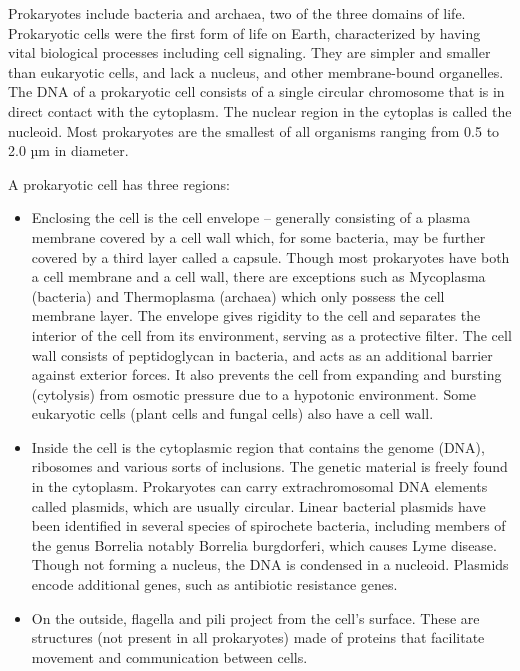Prokaryotes include bacteria and archaea, two of the three domains of life. Prokaryotic cells were the first form of life on Earth, characterized by having vital biological processes including cell signaling. They are simpler and smaller than eukaryotic cells, and lack a nucleus, and other membrane-bound organelles. The DNA of a prokaryotic cell consists of a single circular chromosome that is in direct contact with the cytoplasm. The nuclear region in the cytoplas is called the nucleoid. Most prokaryotes are the smallest of all organisms ranging from 0.5 to 2.0 µm in diameter.

A prokaryotic cell has three regions:

\begin{itemize}
\tightlist
\item
  Enclosing the cell is the cell envelope -- generally consisting of a plasma membrane covered by a cell wall which, for some bacteria, may be further covered by a third layer called a capsule. Though most prokaryotes have both a cell membrane and a cell wall, there are exceptions such as Mycoplasma (bacteria) and Thermoplasma (archaea) which only possess the cell membrane layer. The envelope gives rigidity to the cell and separates the interior of the cell from its environment, serving as a protective filter. The cell wall consists of peptidoglycan in bacteria, and acts as an additional barrier against exterior forces. It also prevents the cell from expanding and bursting (cytolysis) from osmotic pressure due to a hypotonic environment. Some eukaryotic cells (plant cells and fungal cells) also have a cell wall.
\item
  Inside the cell is the cytoplasmic region that contains the genome (DNA), ribosomes and various sorts of inclusions. The genetic material is freely found in the cytoplasm. Prokaryotes can carry extrachromosomal DNA elements called plasmids, which are usually circular. Linear bacterial plasmids have been identified in several species of spirochete bacteria, including members of the genus Borrelia notably Borrelia burgdorferi, which causes Lyme disease. Though not forming a nucleus, the DNA is condensed in a nucleoid. Plasmids encode additional genes, such as antibiotic resistance genes.
\item
  On the outside, flagella and pili project from the cell's surface. These are structures (not present in all prokaryotes) made of proteins that facilitate movement and communication between cells.
\end{itemize}

